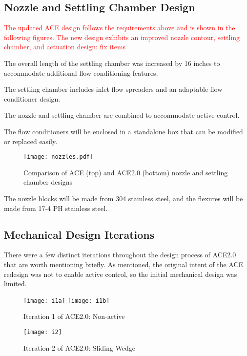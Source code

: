 \subsection{Nozzle and Settling Chamber Design}

\textcolor{red}{The updated ACE design follows the requirements above and is shown in the following figures. The new design exhibits an improved nozzle contour, settling chamber, and actuation design: fix items} 

The overall length of the settling chamber was increased by 16 inches to accommodate additional flow conditioning features.

The settling chamber includes inlet flow spreaders and an adaptable flow conditioner design.

The nozzle and settling chamber are combined to accommodate active control.

The flow conditioners will be enclosed in a standalone box that can be modified or replaced easily.

\begin{figure}[ht]
    \centering
    \texttt{[image: nozzles.pdf]}
    \caption{Comparison of ACE (top) and ACE2.0 (bottom) nozzle and settling chamber designs}
    \label{fig:nozzles}
\end{figure}

The nozzle blocks will be made from 304 stainless steel, and the flexures will be made from 17-4 PH stainless steel.

\subsection{Mechanical Design Iterations}

There were a few distinct iterations throughout the design process of ACE2.0 that are worth mentioning briefly. As mentioned, the original intent of the ACE redesign was not to enable active control, so the initial mechanical design was limited. 

\begin{figure}[ht]
    \centering
    \texttt{[image: i1a]}
    \texttt{[image: i1b]}
    \caption{Iteration 1 of ACE2.0: Non-active}
    \label{fig:i1}
\end{figure}

\begin{figure}[ht]
    \centering
    \texttt{[image: i2]}
    \caption{Iteration 2 of ACE2.0: Sliding Wedge}
    \label{fig:i2}
\end{figure}


